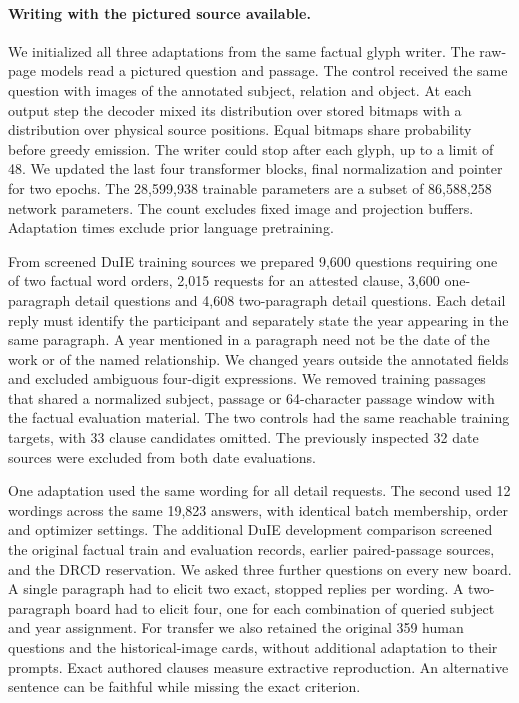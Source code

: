 \paragraph{Writing with the pictured source available.}
We initialized all three adaptations from the same factual glyph writer. The raw-page models read a pictured question and passage. The control received the same question with images of the annotated subject, relation and object. At each output step the decoder mixed its distribution over stored bitmaps with a distribution over physical source positions. Equal bitmaps share probability before greedy emission. The writer could stop after each glyph, up to a limit of 48. We updated the last four transformer blocks, final normalization and pointer for two epochs. The 28,599,938 trainable parameters are a subset of 86,588,258 network parameters. The count excludes fixed image and projection buffers. Adaptation times exclude prior language pretraining.

From screened DuIE training sources we prepared 9,600 questions requiring one of two factual word orders, 2,015 requests for an attested clause, 3,600 one-paragraph detail questions and 4,608 two-paragraph detail questions. Each detail reply must identify the participant and separately state the year appearing in the same paragraph. A year mentioned in a paragraph need not be the date of the work or of the named relationship. We changed years outside the annotated fields and excluded ambiguous four-digit expressions. We removed training passages that shared a normalized subject, passage or 64-character passage window with the factual evaluation material. The two controls had the same reachable training targets, with 33 clause candidates omitted. The previously inspected 32 date sources were excluded from both date evaluations.

One adaptation used the same wording for all detail requests. The second used 12 wordings across the same 19,823 answers, with identical batch membership, order and optimizer settings. The additional DuIE development comparison screened the original factual train and evaluation records, earlier paired-passage sources, and the DRCD reservation. We asked three further questions on every new board. A single paragraph had to elicit two exact, stopped replies per wording. A two-paragraph board had to elicit four, one for each combination of queried subject and year assignment. For transfer we also retained the original 359 human questions and the historical-image cards, without additional adaptation to their prompts. Exact authored clauses measure extractive reproduction. An alternative sentence can be faithful while missing the exact criterion.
